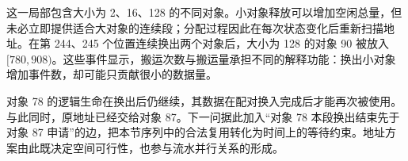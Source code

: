 这一局部包含大小为 2、16、128 的不同对象。小对象释放可以增加空闲总量，但未必立即提供适合大对象的连续段；分配过程因此在每次状态变化后重新扫描地址。在第 244、245 个位置连续换出两个对象后，大小为 128 的对象 90 被放入 $[780,908)$。这些事件显示，搬运次数与搬运量承担不同的解释功能：换出小对象增加事件数，却可能只贡献很小的数据量。

对象 78 的逻辑生命在换出后仍继续，其数据在配对换入完成后才能再次被使用。与此同时，原地址已经交给对象 87。下一问据此加入“对象 78 本段换出结束先于对象 87 申请”的边，把本节序列中的合法复用转化为时间上的等待约束。地址方案由此既决定空间可行性，也参与流水并行关系的形成。
